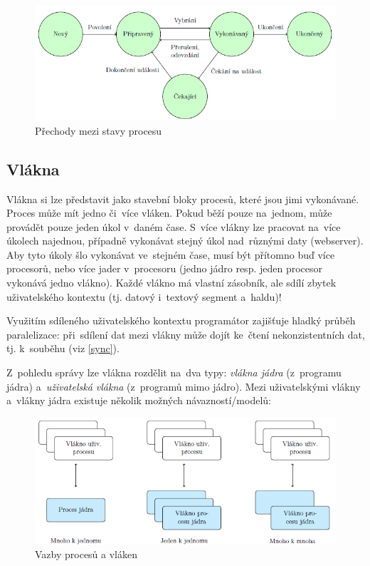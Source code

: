 \begin{figure}
	\centering
	\includegraphics[scale=1]{images/proc_states.png}
	\caption{Přechody mezi stavy procesu}
	\label{proc_states}
\end{figure}

\subsection{Vlákna}

Vlákna si lze představit jako stavební bloky procesů, které jsou jimi vykonávané. Proces může mít jedno či~více vláken. Pokud běží pouze na~jednom, může provádět pouze jeden úkol v~daném čase. S~více vlákny lze pracovat na~více úkolech najednou, případně vykonávat stejný úkol nad~různými daty (webserver). Aby tyto úkoly šlo vykonávat ve~stejném čase, musí být přítomno buď více procesorů, nebo více jader v~procesoru (jedno jádro resp. jeden procesor vykonává jedno vlákno). Každé vlákno má vlastní zásobník, ale sdílí zbytek uživatelského kontextu (tj. datový i~textový segment a~haldu)!

Využitím sdíleného uživatelského kontextu programátor zajišťuje hladký průběh paralelizace: při~sdílení dat mezi vlákny může dojít ke~čtení nekonzistentních dat, tj. k~souběhu (viz \ref{sync}). 

Z~pohledu správy lze vlákna rozdělit na~dva typy: \emph{vlákna jádra} (z~programu jádra) a~\emph{uživatelská vlákna} (z~programů mimo jádro). Mezi uživatelskými vlákny a~vlákny jádra existuje několik možných návazností/modelů:

\begin{figure}[ht]
	\centering
	\includegraphics[scale=1]{images/thread_models.png}
	\caption{Vazby procesů a vláken}
	\label{thread_models}
\end{figure}

